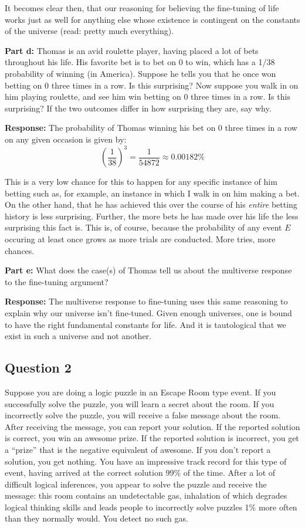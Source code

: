 \documentclass{article}
\begin{document}
It becomes clear then, that our reasoning for believing the fine-tuning of life works just as well for anything else whose existence is contingent on the constants of the universe (read: pretty much everything).
\bigskip

\noindent\textbf{Part d:} Thomas is an avid roulette player, having placed a lot of bets throughout his life.  His favorite bet is to bet on 0 to win, which has a 1/38 probability of winning (in America).  Suppose he tells you that he once won betting on 0 three times in a row.  Is this surprising?  Now suppose you walk in on him playing roulette, and see him win betting on 0 three times in a row.  Is this surprising? If the two outcomes differ in how surprising they are, say why.
\bigskip

\noindent\textbf{Response:} The probability of Thomas winning his bet on 0 three times in a row on any given occasion is given by:
$$\left(\frac{1}{38}\right)^3=\frac{1}{54872}\approx0.00182\%$$

This is a very low chance for this to happen for any specific instance of him betting such as, for example, an instance in which I walk in on him making a bet. On the other hand, that he has achieved this over the course of his \textit{entire} betting history is less surprising. Further, the more bets he has made over his life the less surprising this fact is. This is, of course, because the probability of any event $E$ occuring at least once grows as more trials are conducted. More tries, more chances.
\bigskip

\noindent\textbf{Part e:} What does the case(s) of Thomas tell us about the multiverse response to the fine-tuning argument?
\bigskip

\noindent\textbf{Response:} The multiverse response to fine-tuning uses this same reasoning to explain why our universe isn't fine-tuned. Given enough universes, one is bound to have the right fundamental constants for life. And it is tautological that we exist in such a universe and not another.
\bigskip

\subsection*{Question 2}
Suppose you are doing a logic puzzle in an Escape Room type event. If you successfully solve the puzzle, you will learn a secret about the room. If you incorrectly solve the puzzle, you will receive a false message about the room. After receiving the message, you can report your solution. If the reported solution is correct, you win an awesome prize. If the reported solution is incorrect, you get a “prize” that is the negative equivalent of awesome. If you don’t report a solution, you get nothing. You have an impressive track record for this type of event, having arrived at the correct solution 99\% of the time. After a lot of difficult logical inferences, you appear to solve the puzzle and receive the message: this room contains an undetectable gas, inhalation of which degrades logical thinking skills and leads people to incorrectly solve puzzles 1\% more often than they normally would. You detect no such gas.
\bigskip
\end{document}
